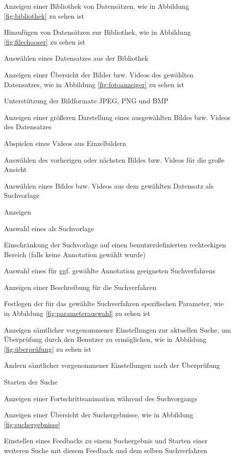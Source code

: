 \begin{description}
	\item[] Anzeigen einer Bibliothek von Datensätzen, wie in Abbildung \ref{fig:bibliothek} zu sehen ist
	\item[] Hinzufügen von Datensätzen zur Bibliothek, wie in Abbildung \ref{fig:filechooser} zu sehen ist
	\item[] Ausw\"ahlen eines Datensatzes aus der Bibliothek
	\item[] Anzeigen einer Übersicht der Bilder bzw. Videos des gewählten Datensatzes, wie in Abbildung \ref{fig:fotoanzeiger} zu sehen ist
	\item[] Unterstützung der Bildformate JPEG, PNG und BMP
	\item[] Anzeigen einer größeren Darstellung eines ausgewählten Bildes bzw. Videos des Datensatzes
	\item[] Abspielen eines Videos aus Einzelbildern
	\item[] Auswählen des vorherigen oder nächsten Bildes bzw. Videos für die große Ansicht %
	\item[] Ausw\"ahlen eines Bildes bzw. Videos aus dem gewählten Datensatz als Suchvorlage
	\item[] Anzeigen 
	\item[] Auswahl eines  als Suchvorlage
	\item[] Einschränkung der Suchvorlage auf einen benutzerdefinierten rechteckigen Bereich (falls keine \gls{Annotation} gewählt wurde)
	\item[] Auswahl eines für ggf. gewählte \gls{Annotation} geeigneten Suchverfahrens
	\item[] Anzeigen einer Beschreibung für die Suchverfahren
	\item[] Festlegen der für das gewählte Suchverfahren spezifischen Parameter, wie in Abbildung \ref{fig:parameterauswahl} zu sehen ist
	\item[] Anzeigen sämtlicher vorgenommener Einstellungen zur aktuellen Suche, um Überprüfung durch den Benutzer zu ermöglichen, wie in Abbildung \ref{fig:überprüfung} zu sehen ist
	\item[] Ändern sämtlicher vorgenommener Einstellungen nach der Überprüfung
	\newline
	\item[] Starten der Suche
	\item[] Anzeigen einer Fortschrittsanimation während des Suchvorgangs
	\newline
	\item[] Anzeigen einer \"Ubersicht der Suchergebnisse, wie in Abbildung \ref{fig:suchergebnisse}
	\item[] Einstellen eines Feedbacks zu einem Suchergebnis und Starten einer weiteren Suche mit diesem Feedback und dem selben Suchverfahren
	

\end{description}
